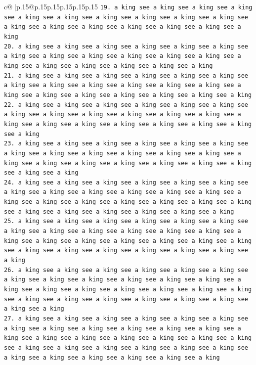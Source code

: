 \documentclass{article}
\begin{document}
{\begin{supertabular}{c@{$\;$}|p{.15\linewidth}@{}p{.15\linewidth}p{.15\linewidth}p{.15\linewidth}p{.15\linewidth}p{.15\linewidth}}
{{{\texttt{19. a king see a king see a king see a king see a king see a king see a king see a king see a king see a king see a king see a king see a king see a king see a king see a king see a king} \\
\texttt{20. a king see a king see a king see a king see a king see a king see a king see a king see a king see a king see a king see a king see a king see a king see a king see a king see a king see a king} \\
\texttt{21. a king see a king see a king see a king see a king see a king see a king see a king see a king see a king see a king see a king see a king see a king see a king see a king see a king see a king see a king} \\
\texttt{22. a king see a king see a king see a king see a king see a king see a king see a king see a king see a king see a king see a king see a king see a king see a king see a king see a king see a king see a king see a king} \\
\texttt{23. a king see a king see a king see a king see a king see a king see a king see a king see a king see a king see a king see a king see a king see a king see a king see a king see a king see a king see a king see a king see a king} \\
\texttt{24. a king see a king see a king see a king see a king see a king see a king see a king see a king see a king see a king see a king see a king see a king see a king see a king see a king see a king see a king see a king see a king see a king see a king see a king see a king} \\
\texttt{25. a king see a king see a king see a king see a king see a king see a king see a king see a king see a king see a king see a king see a king see a king see a king see a king see a king see a king see a king see a king see a king see a king see a king see a king see a king see a king} \\
\texttt{26. a king see a king see a king see a king see a king see a king see a king see a king see a king see a king see a king see a king see a king see a king see a king see a king see a king see a king see a king see a king see a king see a king see a king see a king see a king see a king see a king} \\
\texttt{27. a king see a king see a king see a king see a king see a king see a king see a king see a king see a king see a king see a king see a king see a king see a king see a king see a king see a king see a king see a king see a king see a king see a king see a king see a king see a king see a king see a king see a king see a king see a king} \\
}}}
\end{supertabular}}
\end{document}
